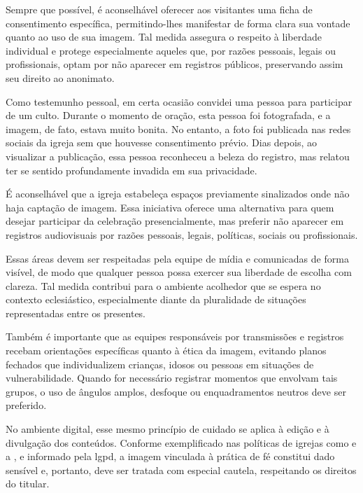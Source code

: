 Sempre que possível, é aconselhável oferecer aos visitantes uma ficha de consentimento específica, permitindo-lhes manifestar de forma clara sua vontade quanto ao uso de sua imagem. Tal medida assegura o respeito à liberdade individual e protege especialmente aqueles que, por razões pessoais, legais ou profissionais, optam por não aparecer em registros públicos, preservando assim seu direito ao anonimato.

Como testemunho pessoal, em certa ocasião convidei uma pessoa para participar de um culto. Durante o momento de oração, esta pessoa foi fotografada, e a imagem, de fato, estava muito bonita. No entanto, a foto foi publicada nas redes sociais da igreja sem que houvesse consentimento prévio. Dias depois, ao visualizar a publicação, essa pessoa reconheceu a beleza do registro, mas relatou ter se sentido profundamente invadida em sua privacidade.


É aconselhável que a igreja estabeleça espaços previamente sinalizados onde não haja captação de imagem. Essa iniciativa oferece uma alternativa para quem desejar participar da celebração presencialmente, mas preferir não aparecer em registros audiovisuais por razões pessoais, legais, políticas, sociais ou profissionais.

Essas áreas devem ser respeitadas pela equipe de mídia e comunicadas de forma visível, de modo que qualquer pessoa possa exercer sua liberdade de escolha com clareza. Tal medida contribui para o ambiente acolhedor que se espera no contexto eclesiástico, especialmente diante da pluralidade de situações representadas entre os presentes.

Também é importante que as equipes responsáveis por transmissões e registros recebam orientações específicas quanto à ética da imagem, evitando planos fechados que individualizem crianças, idosos ou pessoas em situações de vulnerabilidade. Quando for necessário registrar momentos que envolvam tais grupos, o uso de ângulos amplos, desfoque ou enquadramentos neutros deve ser preferido.

No ambiente digital, esse mesmo princípio de cuidado se aplica à edição e à divulgação dos conteúdos. Conforme exemplificado nas políticas de igrejas como  e a , e informado pela \gls{lgpd}, a imagem vinculada à prática de fé constitui dado sensível e, portanto, deve ser tratada com especial cautela, respeitando os direitos do titular.

